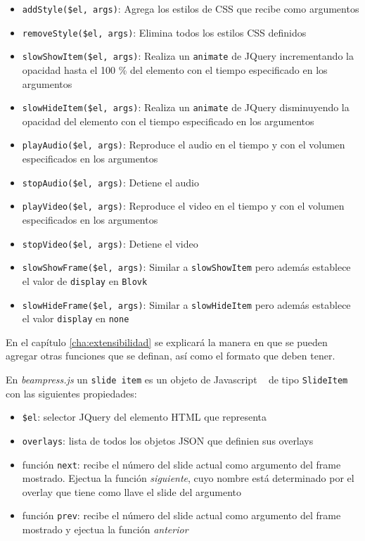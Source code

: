 			\begin{itemize}
				\item \texttt{addStyle(\$el, args)}: Agrega los estilos de CSS que recibe como argumentos
				\item \texttt{removeStyle(\$el, args)}: Elimina todos los estilos CSS definidos
				\item \texttt{slowShowItem(\$el, args)}: Realiza un \texttt{animate} de JQuery incrementando la opacidad hasta el 100 \% del elemento con el tiempo especificado en los argumentos
				\item \texttt{slowHideItem(\$el, args)}: Realiza un \texttt{animate} de JQuery disminuyendo la opacidad del elemento con el tiempo especificado en los argumentos
				\item \texttt{playAudio(\$el, args)}: Reproduce el audio en el tiempo y con el volumen especificados en los argumentos
				\item \texttt{stopAudio(\$el, args)}: Detiene el audio
				\item \texttt{playVideo(\$el, args)}: Reproduce el video en el tiempo y con el volumen especificados en los argumentos
				\item \texttt{stopVideo(\$el, args)}: Detiene el video
				\item \texttt{slowShowFrame(\$el, args)}: Similar a \texttt{slowShowItem} pero además establece el valor de \texttt{display} en \texttt{Blovk}
				\item \texttt{slowHideFrame(\$el, args)}: Similar a \texttt{slowHideItem} pero además establece el valor \texttt{display} en \texttt{none}				
			\end{itemize}
			En el capítulo \ref{cha:extensibilidad} se explicará la manera en que se pueden agregar otras funciones que se definan, así como el formato que deben tener.

			En \textit{beampress.js} un \texttt{slide item} es un objeto de Javascript ~\cite{book:1047044} de tipo \texttt{SlideItem} con las siguientes propiedades:

			\begin{itemize}
			\label{it:slide_item}
			 	\item \texttt{\$el}: selector JQuery del elemento HTML que representa
			 	\item \texttt{overlays}: lista de todos los objetos JSON que definien sus overlays
			 	\item función \texttt{next}: recibe el número del slide actual como argumento del frame mostrado. Ejectua la función \textit{siguiente}, cuyo nombre está determinado por el overlay que tiene como llave el slide del argumento 
			 	\item función \texttt{prev}: recibe el número del slide actual como argumento del frame mostrado y ejectua la función \textit{anterior}			 	
			 \end{itemize} 
				

